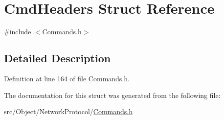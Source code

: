 \hypertarget{struct_cmd_headers}{
\section{CmdHeaders Struct Reference}
\label{struct_cmd_headers}
}


{\ttfamily \#include $<$Commands.h$>$}



\subsection{Detailed Description}


Definition at line 164 of file Commands.h.



The documentation for this struct was generated from the following file:\begin{DoxyCompactItemize}
\item 
src/Object/NetworkProtocol/\hyperlink{_commands_8h}{Commands.h}\end{DoxyCompactItemize}
